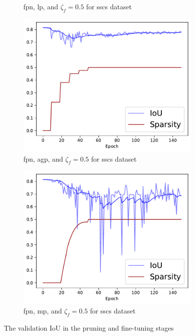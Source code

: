 \documentclass[mathematics,article,submit,pdftex,moreauthors]{Definitions/mdpi}
\begin{document}
\begin{figure}[!ht]
\begin{subfigure}[t]{.29\textwidth}
        \caption{\ac{fpn}, \ac{lp}, and $\zeta_f=0.5$ for \ac{sscs} dataset}
        \label{fig:results:pruning:iou:fpn-lp-0.5-sscs}
      \end{subfigure}
      \hfill
      \begin{subfigure}[t]{.29\textwidth}
        \centering
        \includegraphics[width=.95\linewidth]{figures/pruning/fpn_agp_0.5_CCSCtraining_progress.pdf}
        \caption{\ac{fpn}, \ac{agp}, and $\zeta_f=0.5$ for \ac{sscs} dataset}
        \label{fig:results:pruning:iou:fpn-agp-0.5-sscs}
      \end{subfigure}
      \hfill
      \begin{subfigure}[t]{.29\textwidth}
        \centering
        \includegraphics[width=.95\linewidth]{figures/pruning/fpn_movement_0.5_CCSCtraining_progress.pdf}
        \caption{\ac{fpn}, \ac{mp}, and $\zeta_f=0.5$ for \ac{sscs} dataset}
        \label{fig:results:pruning:iou:fpn-mp-0.5-sscs}
      \end{subfigure}
      \caption{The validation IoU in the pruning and fine-tuning stages}
      \label{fig:results:pruning:iou}
\end{figure}
\end{document}
